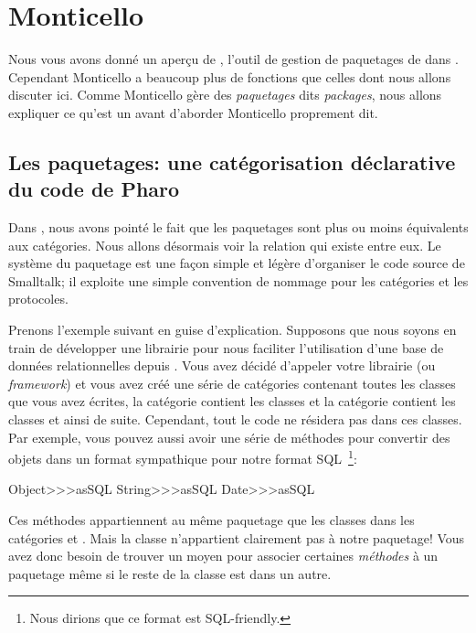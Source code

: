 \documentclass[a4paper,10pt,twoside]{book}
\begin{document}
\section{Monticello}

Nous vous avons donné un aperçu de , l'outil de gestion
de paquetages de \pharo dans .  
Cependant Monticello a beaucoup plus de fonctions que celles dont nous allons
discuter ici.
Comme Monticello gère des \emph{paquetages} dits \emph{packages}, nous allons expliquer ce qu'est
un  avant d'aborder Monticello proprement dit.

\subsection{Les paquetages: une catégorisation déclarative du code de Pharo}

Dans , nous avons pointé le fait
que les paquetages sont plus ou moins équivalents aux catégories. 
Nous allons désormais voir la relation qui existe entre eux.
Le système du paquetage est une façon simple et légère
d'organiser le code source de Smalltalk; il exploite une simple
convention de nommage pour les catégories et les protocoles.

Prenons l'exemple suivant en guise d'explication.
Supposons que nous soyons en train de développer une librairie pour
nous faciliter l'utilisation d'une base de données relationnelles depuis
\pharo. Vous avez décidé d'appeler votre librairie (ou \emph{framework})
 et vous avez créé une série de catégories
contenant toutes les classes que vous avez écrites, \eg la catégorie
 contient les classes
 et la catégorie
 contient les classes
et ainsi de suite. Cependant, tout le code ne résidera pas dans ces classes.
Par exemple, vous pouvez aussi avoir une série de méthodes pour 
convertir des objets dans un format sympathique pour notre format
SQL~\footnote{Nous dirions que ce format est SQL-friendly.}:

\begin{code}{}
Object>>>asSQL
String>>>asSQL
Date>>>asSQL
\end{code}

\noindent
Ces méthodes appartiennent au même paquetage que les classes
dans les catégories  et .
Mais la classe  n'appartient clairement pas à notre paquetage!
Vous avez donc besoin de trouver un moyen pour associer certaines
\emph{méthodes} à un paquetage même si le reste de la classe est dans
un autre. 
\end{document}
